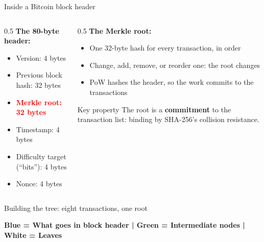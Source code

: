 \ifdefined\PRESENTATION\else\PassOptionsToClass{handout}{beamer}\fi\documentclass[aspectratio=169, lualatex]{beamer}
\begin{document}
\begin{frame}{Inside a Bitcoin block header}
	\begin{columns}[c]
		\begin{column}{0.5\textwidth}
			\textbf{The 80-byte header:}
			\begin{itemize}
				\item Version: 4 bytes
				\item Previous block hash: 32 bytes
				\item \textcolor{red}{\textbf{Merkle root: 32 bytes}}
				\item Timestamp: 4 bytes
				\item Difficulty target (``bits''): 4 bytes
				\item Nonce: 4 bytes
			\end{itemize}
		\end{column}
		\begin{column}{0.5\textwidth}
			\textbf{The Merkle root:}
			\begin{itemize}
				\item One 32-byte hash for every transaction, in order
				\item Change, add, remove, or reorder one: the root changes
				\item PoW hashes the header, so the work commits to the transactions
			\end{itemize}
			\begin{alertblock}{Key property}
				The root is a \textbf{commitment} to the transaction list: binding by SHA-256's collision resistance.
			\end{alertblock}
		\end{column}
	\end{columns}
\end{frame}

\begin{frame}{Building the tree: eight transactions, one root}
	\begin{center}
	\end{center}
	\begin{center}
		\textbf{Blue = What goes in block header | Green = Intermediate nodes | White = Leaves}
	\end{center}
\end{frame}
\end{document}
